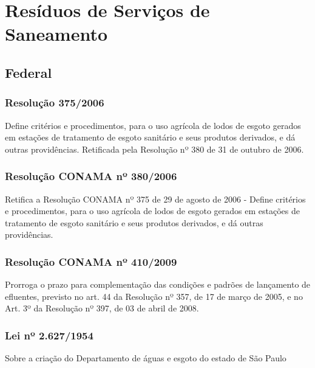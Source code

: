 \section{Resíduos de Serviços de Saneamento}

\begin{subapend}
	\subsection{Federal}
	\begin{subsubapend}
		\item \subsubsection{Resolução 375/2006}
		Define critérios e procedimentos, para o uso agrícola de lodos de esgoto gerados em estações de tratamento de esgoto sanitário e seus produtos derivados, e dá outras providências. Retificada pela Resolução nº 380 de 31 de outubro de 2006.
		\subsubsection{Resolução CONAMA nº 380/2006}
		Retifica a Resolução CONAMA nº 375 de 29 de agosto de 2006 - Define critérios e procedimentos, para o uso agrícola de lodos de esgoto gerados em estações de tratamento de esgoto sanitário e seus produtos derivados, e dá outras providências.
		\subsubsection{Resolução CONAMA nº 410/2009}
		Prorroga o prazo para complementação das condições e padrões de lançamento de efluentes, previsto no art. 44 da Resolução nº 357, de 17 de março de 2005, e no Art. 3º da Resolução nº 397, de 03 de abril de 2008.
		\subsubsection{Lei nº 2.627/1954}
		Sobre a criação do Departamento de águas e esgoto do estado de São Paulo
	\end{subsubapend}
\end{subapend}

